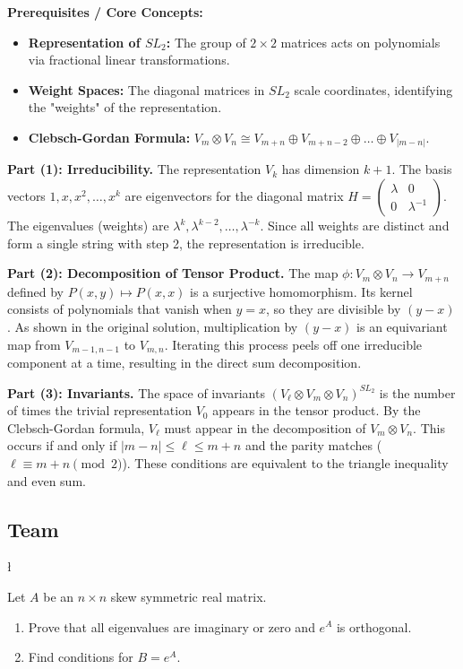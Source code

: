 \begin{solution}
\textbf{Prerequisites / Core Concepts:}
\begin{itemize}
    \item \textbf{Representation of $SL_2$:} The group of $2 \times 2$ matrices acts on polynomials via fractional linear transformations.
    \item \textbf{Weight Spaces:} The diagonal matrices in $SL_2$ scale coordinates, identifying the "weights" of the representation.
    \item \textbf{Clebsch-Gordan Formula:} $V_m \otimes V_n \cong V_{m+n} \oplus V_{m+n-2} \oplus \dots \oplus V_{|m-n|}$.
\end{itemize}

\textbf{Part (1): Irreducibility.}
The representation $V_k$ has dimension $k+1$. The basis vectors $1, x, x^2, \dots, x^k$ are eigenvectors for the diagonal matrix $H = \begin{pmatrix} \lambda & 0 \\ 0 & \lambda^{-1} \end{pmatrix}$.
The eigenvalues (weights) are $\lambda^k, \lambda^{k-2}, \dots, \lambda^{-k}$. 
Since all weights are distinct and form a single string with step 2, the representation is irreducible.

\textbf{Part (2): Decomposition of Tensor Product.}
The map $\phi: V_m \otimes V_n \to V_{m+n}$ defined by $P(x, y) \mapsto P(x, x)$ is a surjective homomorphism.
Its kernel consists of polynomials that vanish when $y=x$, so they are divisible by $(y-x)$.
As shown in the original solution, multiplication by $(y-x)$ is an equivariant map from $V_{m-1, n-1}$ to $V_{m, n}$.
Iterating this process peels off one irreducible component at a time, resulting in the direct sum decomposition.

\textbf{Part (3): Invariants.}
The space of invariants $(V_\ell \otimes V_m \otimes V_n)^{SL_2}$ is the number of times the trivial representation $V_0$ appears in the tensor product.
By the Clebsch-Gordan formula, $V_\ell$ must appear in the decomposition of $V_m \otimes V_n$.
This occurs if and only if $|m-n| \leq \ell \leq m+n$ and the parity matches ($\ell \equiv m+n \pmod 2$).
These conditions are equivalent to the triangle inequality and even sum.
\end{solution}

\subsection*{Team}
\begin{exercise}
\l\label{2013:5}

\label{algebra:2013:5}Let $A$ be an $n \times n$ skew symmetric real matrix.
\begin{enumerate}
    \item Prove that all eigenvalues are imaginary or zero and $e^A$ is orthogonal.
    \item Find conditions for $B = e^A$.
\end{enumerate}
\end{exercise}

